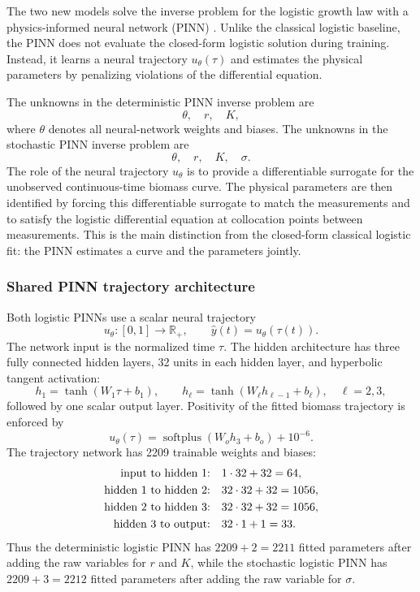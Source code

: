 The two new models solve the inverse problem for the logistic growth law with a
physics-informed neural network (PINN) \citep{raissi2019physics}. Unlike the
classical logistic baseline, the PINN does not evaluate the closed-form
logistic solution during training. Instead, it learns a neural trajectory
$u_\theta(\tau)$ and estimates the physical parameters by penalizing violations
of the differential equation.

The unknowns in the deterministic PINN inverse problem are
$$
  \theta,\quad r,\quad K,
$$
where $\theta$ denotes all neural-network weights and biases. The unknowns in
the
stochastic PINN inverse problem are
$$
  \theta,\quad r,\quad K,\quad \sigma.
$$
The role of the neural trajectory $u_\theta$ is to provide a differentiable
surrogate for the unobserved continuous-time biomass curve. The physical
parameters are then identified by forcing this differentiable surrogate to
match the measurements and to satisfy the logistic differential equation at
collocation points between measurements. This is the main distinction from the
closed-form classical logistic fit: the PINN estimates a curve and the
parameters jointly.

\subsubsection{Shared PINN trajectory architecture}

Both logistic PINNs use a scalar neural trajectory
$$
  u_\theta:[0,1]\rightarrow \mathbb R_+,
  \qquad
  \widehat y(t)=u_\theta(\tau(t)).
$$
The network input is the normalized time $\tau$. The hidden architecture has
three fully connected hidden layers, 32 units in each hidden layer, and
hyperbolic tangent activation:
$$
  h_1=\tanh(W_1\tau+b_1),\qquad
  h_\ell=\tanh(W_\ell h_{\ell-1}+b_\ell),\quad \ell=2,3,
$$
followed by one scalar output layer. Positivity of the fitted biomass
trajectory is enforced by
$$
  u_\theta(\tau)=\operatorname{softplus}(W_o h_3+b_o)+10^{-6}.
$$
The trajectory network has 2209 trainable weights and biases:
$$
\begin{aligned}
  \hbox{input to hidden 1:}&\quad 1\cdot 32+32=64,\\
  \hbox{hidden 1 to hidden 2:}&\quad 32\cdot 32+32=1056,\\
  \hbox{hidden 2 to hidden 3:}&\quad 32\cdot 32+32=1056,\\
  \hbox{hidden 3 to output:}&\quad 32\cdot 1+1=33.
\end{aligned}
$$
Thus the deterministic logistic PINN has $2209+2=2211$ fitted parameters after
adding the raw variables for $r$ and $K$, while the stochastic logistic PINN
has $2209+3=2212$ fitted parameters after adding the raw variable for
$\sigma$.

